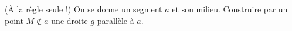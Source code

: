 (À la règle seule !) On se donne un segment $a$ et son milieu. Construire par un point $M \notin a$ une droite $g$ parallèle à $a$.
